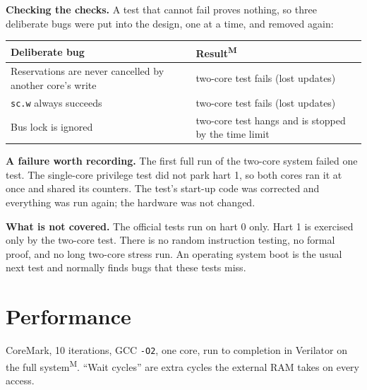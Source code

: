 \documentclass[10pt,a4paper]{article}
\newcommand{\code}[1]{\texttt{#1}}
\newcommand{\meas}{\textsuperscript{M}}
\begin{document}
\textbf{Checking the checks.} A test that cannot fail proves nothing, so three deliberate bugs were put
into the design, one at a time, and removed again:
\begin{center}\small
\begin{tabular}{@{}ll@{}}
\toprule
Deliberate bug & Result\meas\\
\midrule
Reservations are never cancelled by another core's write & two-core test fails (lost updates)\\
\code{sc.w} always succeeds & two-core test fails (lost updates)\\
Bus lock is ignored & two-core test hangs and is stopped by the time limit\\
\bottomrule
\end{tabular}
\end{center}

\textbf{A failure worth recording.} The first full run of the two-core system failed one test. The
single-core privilege test did not park hart 1, so both cores ran it at once and shared its counters. The
test's start-up code was corrected and everything was run again; the hardware was not changed.

\textbf{What is not covered.} The official tests run on hart 0 only. Hart 1 is exercised only by the
two-core test. There is no random instruction testing, no formal proof, and no long two-core stress run.
An operating system boot is the usual next test and normally finds bugs that these tests miss.

\section{Performance}\label{sec:perf}
CoreMark, 10 iterations, GCC \code{-O2}, one core, run to completion in Verilator on the full system\meas.
``Wait cycles'' are extra cycles the external RAM takes on every access.

\begin{center}
\end{center}
\end{document}
